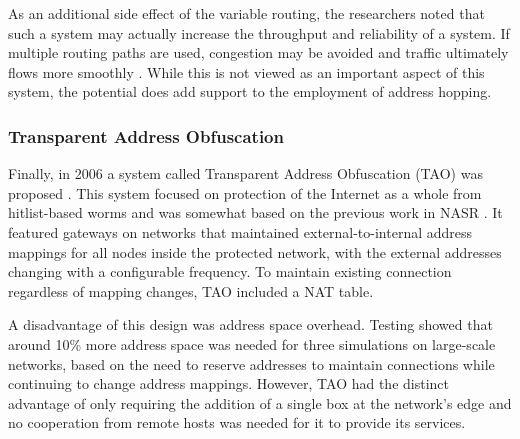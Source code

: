 \par As an additional side effect of the variable routing, the researchers noted that such a system may actually increase the throughput and reliability of a system. If multiple routing paths are used, congestion may be avoided and traffic ultimately flows more smoothly \cite{MultimediaDistributed}. While this is not viewed as an important aspect of this system, the potential does add support to the employment of address hopping.

\subsubsection{Transparent Address Obfuscation}
\par Finally, in 2006 a system called Transparent Address Obfuscation (TAO) was proposed \cite{TAO}. This system focused on protection of the Internet as a whole from hitlist-based worms and was somewhat based on the previous work in NASR \cite{NASR}. It featured gateways on networks that maintained external-to-internal address mappings for all nodes inside the protected network, with the external addresses changing with a configurable frequency. To maintain existing connection regardless of mapping changes, TAO included a NAT table. 

\par A disadvantage of this design was address space overhead. Testing showed that around 10\% more address space was needed for three simulations on large-scale networks, based on the need to reserve addresses to maintain connections while continuing to change address mappings. However, TAO had the distinct advantage of only requiring the addition of a single box at the network's edge and no cooperation from remote hosts was needed for it to provide its services.


